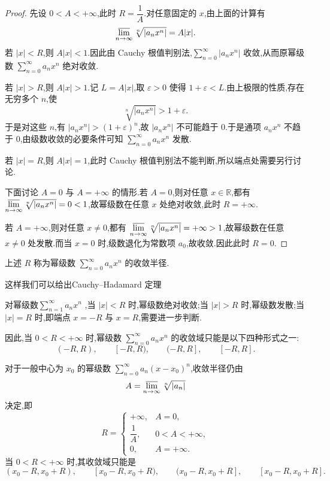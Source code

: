 \begin{proof}
	先设 \(0<A<+\infty\),此时 \(R=\dfrac{1}{A}\).对任意固定的 \(x\),由上面的计算有
	\[
	\varlimsup_{n\to\infty}\sqrt[n]{|a_nx^n|}=A|x|.
	\]
	若 \(|x|<R\),则 \(A|x|<1\).因此由 Cauchy 根值判别法,\(\sum\limits_{n=0}^{\infty}|a_nx^n|\) 收敛,从而原幂级数 \(\sum\limits_{n=0}^{\infty}a_nx^n\) 绝对收敛.
	
	若 \(|x|>R\),则 \(A|x|>1\).记 \(L=A|x|\),取 \(\varepsilon>0\) 使得 \(1+\varepsilon<L\).由上极限的性质,存在无穷多个 \(n\),使
	\[
	\sqrt[n]{|a_nx^n|}>1+\varepsilon.
	\]
	于是对这些 \(n\),有 \(|a_nx^n|>(1+\varepsilon)^n\),故 \(|a_nx^n|\) 不可能趋于 \(0\).于是通项 \(a_nx^n\) 不趋于 \(0\),由级数收敛的必要条件可知 \(\sum\limits_{n=0}^{\infty}a_nx^n\) 发散.
	
	若 \(|x|=R\),则 \(A|x|=1\),此时 Cauchy 根值判别法不能判断,所以端点处需要另行讨论.
	
	下面讨论 \(A=0\) 与 \(A=+\infty\) 的情形.若 \(A=0\),则对任意 \(x\in\mathbb{R}\),都有 \(\varlimsup\limits_{n\to\infty}\sqrt[n]{|a_nx^n|}=0<1\),故幂级数在任意 \(x\) 处绝对收敛,此时 \(R=+\infty\).
	
	若 \(A=+\infty\),则对任意 \(x\neq 0\),都有 \(\varlimsup\limits_{n\to\infty}\sqrt[n]{|a_nx^n|}=+\infty>1\),故幂级数在任意 \(x\neq 0\) 处发散.而当 \(x=0\) 时,级数退化为常数项 \(a_0\),故收敛.因此此时 \(R=0\).
\end{proof}

\begin{definition}
	上述 \(R\) 称为幂级数 \(\sum_{n=0}^{\infty}a_nx^n\) 的收敛半径.
\end{definition}
这样我们可以给出Cauchy--Hadamard 定理
\begin{theorem}
	对幂级数$\sum\limits_{n=1}^\infty a_n x^n$
	,当 \(|x|<R\) 时,幂级数绝对收敛;当 \(|x|>R\) 时,幂级数发散;当 \(|x|=R\) 时,即端点 \(x=-R\) 与 \(x=R\),需要进一步判断.
\end{theorem}


因此,当 \(0<R<+\infty\) 时,幂级数 \(\sum_{n=0}^{\infty}a_nx^n\) 的收敛域只能是以下四种形式之一:
\[
(-R,R),\qquad [-R,R),\qquad (-R,R],\qquad [-R,R].
\]

对于一般中心为 \(x_0\) 的幂级数 \(\sum_{n=0}^{\infty}a_n(x-x_0)^n\),收敛半径仍由
\[
A=\varlimsup_{n\to\infty}\sqrt[n]{|a_n|}
\]
决定,即
\[
R=
\begin{cases}
	+\infty, & A=0,\\[4pt]
	\dfrac{1}{A}, & 0<A<+\infty,\\[8pt]
	0, & A=+\infty.
\end{cases}
\]
当 \(0<R<+\infty\) 时,其收敛域只能是
\[
(x_0-R,x_0+R),\qquad [x_0-R,x_0+R),\qquad
(x_0-R,x_0+R],\qquad [x_0-R,x_0+R].
\]

